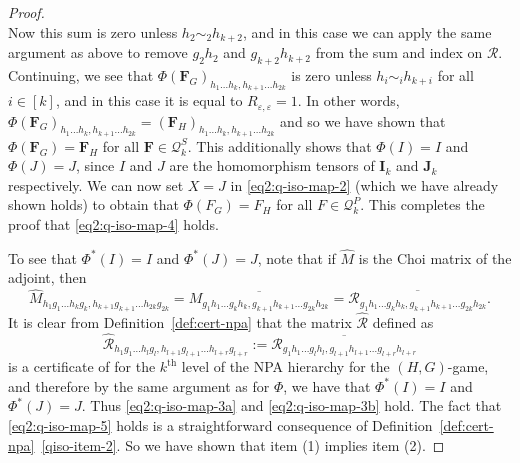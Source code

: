 \documentclass[a4paper,onecolumn,11pt,accepted=2026-01-06]{quantumarticle}
\theoremstyle{plain}
\theoremstyle{remark}
\theoremstyle{definition}
\renewcommand{\epsilon}{\varepsilon}
\begin{document}
\begin{proof}
\begin{equation}
\end{equation}
Now this sum is zero unless $h_2 \sim_2 h_{k+2}$, and in this case we can apply the same argument as above to remove $g_2h_2$ and $g_{k+2}h_{k+2}$ from the sum and index on $\mathcal{R}$. Continuing, we see that $\Phi(\boldsymbol{F}_G)_{h_1 \ldots h_k,h_{k+1}\ldots h_{2k}}$ is zero unless $h_i \sim_i h_{k+i}$ for all $i \in [k]$, and in this case it is equal to $R_{\epsilon,\epsilon} = 1$. In other words, $\Phi(\boldsymbol{F}_G)_{h_1 \ldots h_k,h_{k+1}\ldots h_{2k}} = (\boldsymbol{F}_H)_{h_1 \ldots h_k,h_{k+1}\ldots h_{2k}}$ and so we have shown that $\Phi(\boldsymbol{F}_G) = \boldsymbol{F}_H$ for all $\boldsymbol{F} \in \mathcal{Q}_k^S$. This additionally shows that $\Phi(I) = I$ and $\Phi(J) = J$, since $I$ and $J$ are the homomorphism tensors of $\boldsymbol{I}_k$ and $\boldsymbol{J}_k$ respectively. We can now set $X=J$ in \eqref{eq2:q-iso-map-2} (which we have already shown holds) to obtain that $\Phi(F_G) = F_H$ for all $F \in \mathcal{Q}_k^P$. This completes the proof that \eqref{eq2:q-iso-map-4} holds.

To see that $\Phi^*(I) = I$ and $\Phi^*(J) = J$, note that if $\hat{M}$ is the Choi matrix of the adjoint, then
\[\hat{M}_{h_1g_1\ldots h_kg_k, h_{k+1}g_{k+1}\ldots h_{2k}g_{2k}} = \overline{M_{g_1h_1\ldots g_kh_k, g_{k+1}h_{k+1}\ldots g_{2k}h_{2k}}} = \overline{\mathcal{R}_{g_1h_1\ldots g_kh_k, g_{k+1}h_{k+1}\ldots g_{2k}h_{2k}}}.\]
It is clear from Definition~\ref{def:cert-npa} that the matrix $\hat{\mathcal{R}}$ defined as
\[\hat{\mathcal{R}}_{h_1g_1\ldots h_lg_l, h_{l+1}g_{l+1}\ldots h_{l+r}g_{l+r}}:= \overline{\mathcal{R}_{g_1h_1\ldots g_lh_l, g_{l+1}h_{l+1}\ldots g_{l+r}h_{l+r}}}\]
is a certificate of for the $k^\text{th}$ level of the NPA hierarchy for the $(H,G)$-game, and therefore by the same argument as for $\Phi$, we have that $\Phi^*(I) = I$ and $\Phi^*(J) = J$. Thus \eqref{eq2:q-iso-map-3a} and \eqref{eq2:q-iso-map-3b} hold. The fact that \eqref{eq2:q-iso-map-5} holds is a straightforward consequence of Definition~\ref{def:cert-npa}~\ref{qiso-item-2}. So we have shown that item (1) implies item (2).


\end{proof}
\end{document}
